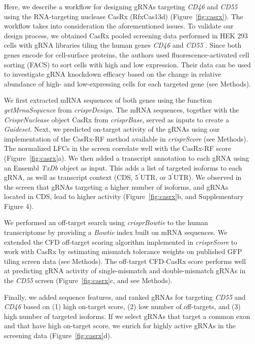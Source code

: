 \documentclass[pdftex,english,10pt]{article}
\begin{document}
Here, we describe a workflow for designing gRNAs targeting \textit{CD46} and \textit{CD55} using the RNA-targeting nuclease CasRx (RfxCas13d) \citep{cas13d} (Figure~\ref{fig:casrx}).
The workflow takes into consideration the aforementioned issues. To validate our design process, we obtained CasRx pooled screening data performed in HEK 293 cells with gRNA libraries tiling the human genes \textit{CD46} and \textit{CD55} \citep{wessels2020massively}. Since both genes encode for cell-surface proteins, the authors used fluorescence-activated cell sorting (FACS) to sort cells with high and low expression. Their data can be used to investigate gRNA knockdown efficacy based on the change in relative abundance of high- and low-expressing cells for each targeted gene (see Methods). 

We first extracted mRNA sequences of both genes using the function \textit{getMrnaSequence} from \textit{crisprDesign}. 
The mRNA sequences, together with the \textit{CrisprNuclease} object CasRx from \textit{crisprBase}, served as inputs to create a \textit{Guideset}.
Next, we predicted on-target activity of the gRNAs using our implementation of the CasRx-RF method \citep{wessels2020massively} available in \textit{crisprScore} (see Methods). The normalized LFCs in the screen correlate well with the CasRx-RF score (Figure~\ref{fig:casrx}a). We then added a transcript annotation to each gRNA using an Ensembl \textit{TxDb} object as input. This adds a list of targeted isoforms to each gRNA, as well as transcript context (CDS, $5^{\prime}$UTR, or $3^{\prime}$UTR). We observed in the screen that gRNAs targeting a higher number of isoforms, and gRNAs located in CDS, lead to higher activity (Figure~\ref{fig:casrx}b, and Supplementary Figure 4). 

We performed an off-target search using \textit{crisprBowtie} to the human transcriptome by providing a \textit{Bowtie} index built on mRNA sequences.
We extended the CFD off-target scoring algorithm implemented in \textit{crisprScore} to work with CasRx by estimating mismatch tolerance weights on published GFP tiling screen data  \citep{wessels2020massively} (see Methods). The off-target CFD-CasRx score performs well at predicting gRNA activity of single-mismatch and double-mismatch gRNAs in the \textit{CD55} screen (Figure~\ref{fig:casrx}c, and see Methods).  

Finally, we added sequence features, and ranked gRNAs for targeting \textit{CD55} and \textit{CD46} based on (1) high on-target score, (2) low number of off-targets, and (3) high number of targeted isoforms. If we select gRNAs that target a common exon and that have high on-target score, we enrich for highly active gRNAs in the screening data (Figure~\ref{fig:casrx}d). 
\end{document}
